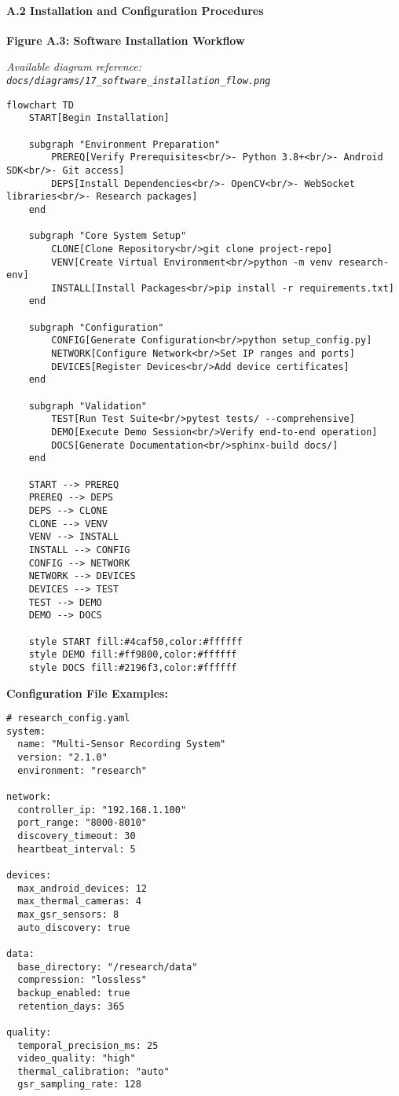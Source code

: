 \documentclass[12pt,a4paper]{article}
\begin{document}
\paragraph{A.2 Installation and Configuration Procedures}

\textbf{Figure A.3: Software Installation Workflow}

\textit{Available diagram reference: \texttt{docs/diagrams/17\_software\_installation\_flow.png}}

\begin{verbatim}
flowchart TD
    START[Begin Installation]
    
    subgraph "Environment Preparation"
        PREREQ[Verify Prerequisites<br/>- Python 3.8+<br/>- Android SDK<br/>- Git access]
        DEPS[Install Dependencies<br/>- OpenCV<br/>- WebSocket libraries<br/>- Research packages]
    end
    
    subgraph "Core System Setup"
        CLONE[Clone Repository<br/>git clone project-repo]
        VENV[Create Virtual Environment<br/>python -m venv research-env]
        INSTALL[Install Packages<br/>pip install -r requirements.txt]
    end
    
    subgraph "Configuration"
        CONFIG[Generate Configuration<br/>python setup_config.py]
        NETWORK[Configure Network<br/>Set IP ranges and ports]
        DEVICES[Register Devices<br/>Add device certificates]
    end
    
    subgraph "Validation"
        TEST[Run Test Suite<br/>pytest tests/ --comprehensive]
        DEMO[Execute Demo Session<br/>Verify end-to-end operation]
        DOCS[Generate Documentation<br/>sphinx-build docs/]
    end
    
    START --> PREREQ
    PREREQ --> DEPS
    DEPS --> CLONE
    CLONE --> VENV
    VENV --> INSTALL
    INSTALL --> CONFIG
    CONFIG --> NETWORK
    NETWORK --> DEVICES
    DEVICES --> TEST
    TEST --> DEMO
    DEMO --> DOCS
    
    style START fill:#4caf50,color:#ffffff
    style DEMO fill:#ff9800,color:#ffffff
    style DOCS fill:#2196f3,color:#ffffff
\end{verbatim}

\textbf{Configuration File Examples:}

\begin{verbatim}
# research_config.yaml
system:
  name: "Multi-Sensor Recording System"
  version: "2.1.0"
  environment: "research"
  
network:
  controller_ip: "192.168.1.100"
  port_range: "8000-8010"
  discovery_timeout: 30
  heartbeat_interval: 5
  
devices:
  max_android_devices: 12
  max_thermal_cameras: 4
  max_gsr_sensors: 8
  auto_discovery: true
  
data:
  base_directory: "/research/data"
  compression: "lossless"
  backup_enabled: true
  retention_days: 365
  
quality:
  temporal_precision_ms: 25
  video_quality: "high"
  thermal_calibration: "auto"
  gsr_sampling_rate: 128
\end{verbatim}
\end{document}
